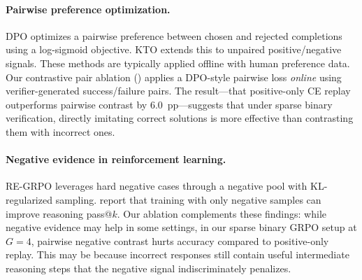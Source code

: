 \paragraph{Pairwise preference optimization.}
DPO \citep{rafailov2023direct} optimizes a pairwise preference between chosen and rejected completions using a log-sigmoid objective.
KTO \citep{ethayarajh2024kto} extends this to unpaired positive/negative signals.
These methods are typically applied offline with human preference data.
Our contrastive pair ablation () applies a DPO-style pairwise loss \emph{online} using verifier-generated success/failure pairs.
The result---that positive-only CE replay outperforms pairwise contrast by 6.0~pp---suggests that under sparse binary verification, directly imitating correct solutions is more effective than contrasting them with incorrect ones.

\paragraph{Negative evidence in reinforcement learning.}
RE-GRPO \citep{regrpo2026} leverages hard negative cases through a negative pool with KL-regularized sampling.
\citet{negative2026} report that training with only negative samples can improve reasoning pass@$k$.
Our ablation complements these findings: while negative evidence may help in some settings, in our sparse binary GRPO setup at $G{=}4$, pairwise negative contrast hurts accuracy compared to positive-only replay.
This may be because incorrect responses still contain useful intermediate reasoning steps that the negative signal indiscriminately penalizes.
